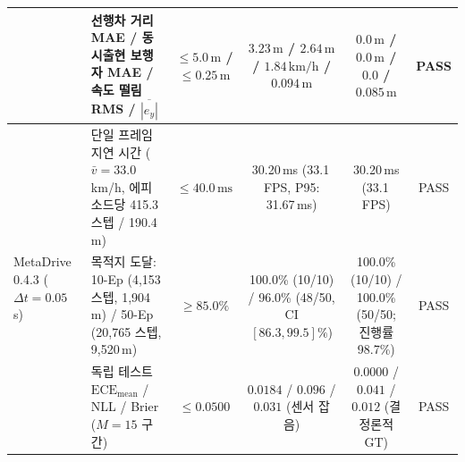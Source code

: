 \documentclass[10pt,twocolumn,a4paper]{article}
\begin{document}
\begin{table}[t]
{\begin{tabular}{llcccc}
 & 선행차 거리 MAE / 동시출현 보행자 MAE / 속도 떨림 RMS / $\overline{|e_y|}$ & $\le 5.0\,\text{m}$ / $\le 0.25\,\text{m}$ & $3.23\,\text{m}$ / $2.64\,\text{m}$ / $1.84\,\text{km/h}$ / $0.094\,\text{m}$ & $0.0\,\text{m}$ / $0.0\,\text{m}$ / $0.0$ / $0.085\,\text{m}$ & PASS \\
\midrule
\multirow{3}{*}{MetaDrive 0.4.3 ($\Delta t=0.05$\,s)} 
 & 단일 프레임 지연 시간 ($\bar{v}=33.0$\,km/h, 에피소드당 415.3 스텝 / 190.4\,m) & $\le 40.0\,\text{ms}$ & 30.20\,ms (33.1\,FPS, P95: 31.67\,ms) & 30.20\,ms (33.1\,FPS) & PASS \\
 & 목적지 도달: 10-Ep (4,153 스텝, 1,904\,m) / 50-Ep (20,765 스텝, 9,520\,m) & $\ge 85.0\%$ & 100.0\% (10/10) / 96.0\% (48/50, CI $[86.3, 99.5]\%$) & 100.0\% (10/10) / 100.0\% (50/50; 진행률 98.7\%) & PASS \\
 & 독립 테스트 $\text{ECE}_{\text{mean}}$ / NLL / Brier ($M=15$ 구간) & $\le 0.0500$ & $0.0184$ / $0.096$ / $0.031$ (센서 잡음) & $0.0000$ / $0.041$ / $0.012$ (결정론적 GT) & PASS \\
\bottomrule
\end{tabular}%
}
\end{table}
\end{document}
